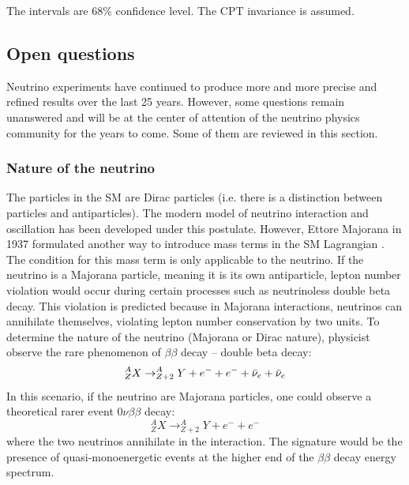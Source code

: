 The intervals are 68\% confidence level. The CPT invariance is assumed.

\subsection{Open questions}
\label{sec:neutrino:questions}

Neutrino experiments have continued to produce more and more precise and refined results over the last 25 years. However, some questions remain unanswered and will be at the center of attention of the neutrino physics community for the years to come. Some of them are reviewed in this section.

%
%
%
%
%

\subsubsection{Nature of the neutrino}

The particles in the SM are Dirac particles (i.e. there is a distinction between particles and antiparticles). The modern model of neutrino interaction and oscillation has been developed under this postulate. However, Ettore Majorana in 1937 formulated another way to introduce mass terms in the SM Lagrangian \cite{majorana_teoria_1937}. The condition for this mass term is only applicable to the neutrino. If the neutrino is a Majorana particle, meaning it is its own antiparticle, lepton number violation would occur during certain processes such as neutrinoless double beta decay. This violation is predicted because in Majorana interactions, neutrinos can annihilate themselves, violating lepton number conservation by two units. To determine the nature of the neutrino (Majorana or Dirac nature), physicist observe the rare phenomenon of $\beta\beta$ decay -- double beta decay:
\begin{equation}
  ^{A}_{Z}X \rightarrow ^{A}_{Z+2}Y + e^- + e^- + \bar{\nu}_{e} + \bar{\nu}_{e}
\end{equation}
In this scenario, if the neutrino are Majorana particles, one could observe a theoretical rarer event $0\nu\beta\beta$ decay:
\begin{equation}
  ^{A}_{Z}X \rightarrow ^{A}_{Z+2}Y + e^- + e^-
\end{equation}
where the two neutrinos annihilate in the interaction. The signature would be the presence of quasi-monoenergetic events at the higher end of the $\beta\beta$ decay energy spectrum.

